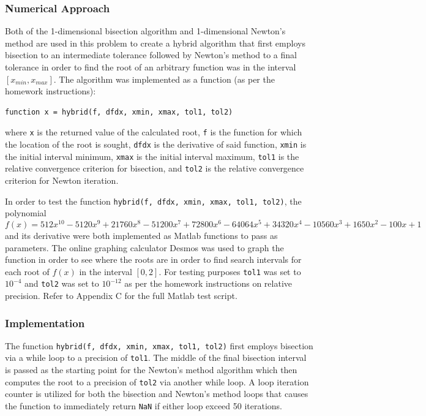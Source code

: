 \documentclass[10pt]{article}
\def\code#1{\texttt{#1}}
\begin{document}
\subsubsection*{Numerical Approach}

Both of the 1-dimensional bisection algorithm and 1-dimensional Newton's method are used in this problem to 
create a hybrid algorithm that first employs bisection to an intermediate tolerance followed by Newton's method to
a final tolerance in order to find the root of an arbitrary function was in the interval $[x_{min}, x_{max}]$.
The algorithm was implemented as a function (as per the homework instructions):
\begin{verbatim}
function x = hybrid(f, dfdx, xmin, xmax, tol1, tol2)
\end{verbatim}
where \code{x} is the returned value of the calculated root, \code{f} is the function for which the location
of the root is sought, \code{dfdx} is the derivative of said function, \code{xmin} is the initial interval 
minimum, \code{xmax} is the initial interval maximum, \code{tol1} is the relative convergence criterion for
bisection, and \code{tol2} is the relative convergence criterion for Newton iteration.

In order to test the function \code{hybrid(f, dfdx, xmin, xmax, tol1, tol2)}, the polynomial 
$$f(x) = 512x^{10}-5120x^9 + 21760x^8-51200x^7 + 72800x^6-64064x^5 + 34320x^4-10560x^3 + 1650x^2-100x + 1$$
and its derivative were both implemented as Matlab functions to pass as parameters. The online graphing 
calculator Desmos was used to graph the function in order to see where the roots are in order to find search intervals
for each root of $f(x)$ in the interval $[0,2]$. For testing purposes \code{tol1} was set to $10^{-4}$ and 
\code{tol2} was set to $10^{-12}$ as per the homework instructions on relative precision. Refer to Appendix C 
for the full Matlab test script. 

\subsubsection*{Implementation}

The function \code{hybrid(f, dfdx, xmin, xmax, tol1, tol2)} first employs bisection via a while loop to a 
precision of \code{tol1}. The middle of the final bisection interval is passed as the starting point for the 
Newton's method algorithm which then computes the root to a precision of \code{tol2} via another while loop. 
A loop iteration counter is utilized for both the bisection and Newton's method loops that causes the function
to immediately return \code{NaN} if either loop exceed 50 iterations.
\end{document}
